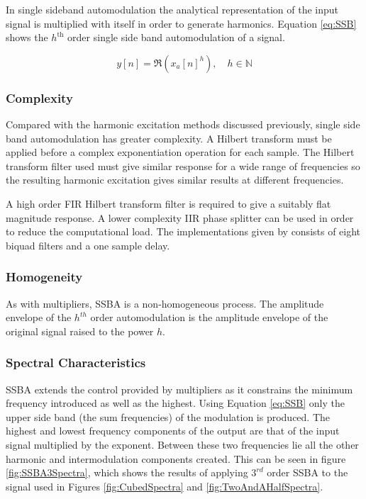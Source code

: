 		In single sideband automodulation the analytical representation of the input signal is multiplied with
		itself in order to generate harmonics. Equation \ref{eq:SSB} shows the $h^{\text{th}}$ order single side
		band automodulation of a signal.

		\begin{equation}
			y[n] = \Re \left( x_{a}[n]^{h} \right), \quad h \in \mathbb{N}
			\label{eq:SSB}
		\end{equation}

		\subsubsection*{Complexity}
			Compared with the harmonic excitation methods discussed previously, single side band automodulation
			has greater complexity. A Hilbert transform must be applied before a complex exponentiation
			operation for each sample. The Hilbert transform filter used must give similar response for a wide
			range of frequencies so the resulting harmonic excitation gives similar results at different
			frequencies.
			
			A high order FIR Hilbert transform filter is required to give a suitably flat magnitude response.
			A lower complexity IIR phase splitter can be used in order to reduce the computational load.
			The implementations given by \citet{niemitalo2003hilbert} consists of eight biquad filters and a
			one sample delay.
			
		\subsubsection*{Homogeneity}
			As with multipliers, SSBA is a non-homogeneous process. The amplitude envelope of the $h^{th}$
			order automodulation is the amplitude envelope of the original signal raised to the power $h$. 

		\subsubsection*{Spectral Characteristics}
			SSBA extends the control provided by multipliers as it constrains the minimum frequency introduced
			as well as the highest. Using Equation \ref{eq:SSB} only the upper side band (the sum frequencies)
			of the modulation is produced. The highest and lowest frequency components of the output are that
			of the input signal multiplied by the exponent. Between these two frequencies lie all the other
			harmonic and intermodulation components created. This can be seen in figure \ref{fig:SSBA3Spectra},
			which shows the results of applying $3^{rd}$ order SSBA to the signal used in Figures
			\ref{fig:CubedSpectra} and \ref{fig:TwoAndAHalfSpectra}. 			
			
